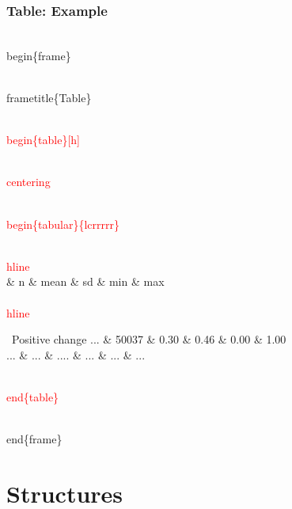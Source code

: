 \documentclass[10pt]{beamer}
\newcommand{\code}{\textcolor{red}}
\begin{document}
 \begin{frame}
  \frametitle{Table: Example}
  

  \begin{semiverbatim}

\\begin\{frame\}

\\frametitle\{Table\}
 
\code{\\begin\{table\}[h]}

\code{\\centering}

\code{\\begin\{tabular\}\{lcrrrrr\}}

 \code{\\hline}
 \\ & n \& mean \& sd \& min \& max \\
  \code{\\hline}

\ Positive change ... \& 50037 \& 0.30 \& 0.46 \& 0.00 \& 1.00\\
 
   ... \& ... \& .... \& ... \& ... \& ...\

\code{\\end\{table\}}

\\end\{frame\}
  \end{semiverbatim}



\end{frame}
      
      \section{Structures}
      
\end{document}
